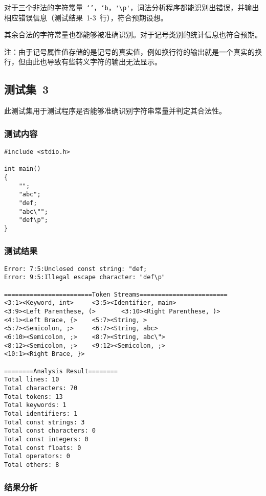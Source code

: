 \documentclass[lang=cn,11pt,a4paper]{paper}
\begin{document}
对于三个非法的字符常量\ \lstinline{‘’}，\lstinline{‘b}，\lstinline{'\p'}，词法分析程序都能识别出错误，并输出相应错误信息（测试结果\ 1-3\ 行），符合预期设想。

其余合法的字符常量也都能够被准确识别。对于记号类别的统计信息也符合预期。

注：由于记号属性值存储的是记号的真实值，例如换行符的输出就是一个真实的换行，但由此也导致有些转义字符的输出无法显示。

\subsection{测试集\ 3}

此测试集用于测试程序是否能够准确识别字符串常量并判定其合法性。

\subsubsection{测试内容}

\begin{lstlisting}
#include <stdio.h>

int main()
{
    "";
    "abc";
    "def;
    "abc\"";
    "def\p";
}
\end{lstlisting}

\subsubsection{测试结果}

\begin{lstlisting}
Error: 7:5:Unclosed const string: "def;
Error: 9:5:Illegal escape character: "def\p"

========================Token Streams========================
<3:1><Keyword, int>     <3:5><Identifier, main>
<3:9><Left Parenthese, (>       <3:10><Right Parenthese, )>
<4:1><Left Brace, {>    <5:7><String, >
<5:7><Semicolon, ;>     <6:7><String, abc>
<6:10><Semicolon, ;>    <8:7><String, abc\">
<8:12><Semicolon, ;>    <9:12><Semicolon, ;>
<10:1><Right Brace, }>

========Analysis Result========
Total lines: 10
Total characters: 70
Total tokens: 13
Total keywords: 1
Total identifiers: 1
Total const strings: 3
Total const characters: 0
Total const integers: 0
Total const floats: 0
Total operators: 0
Total others: 8
\end{lstlisting}

\subsubsection{结果分析}
\end{document}
